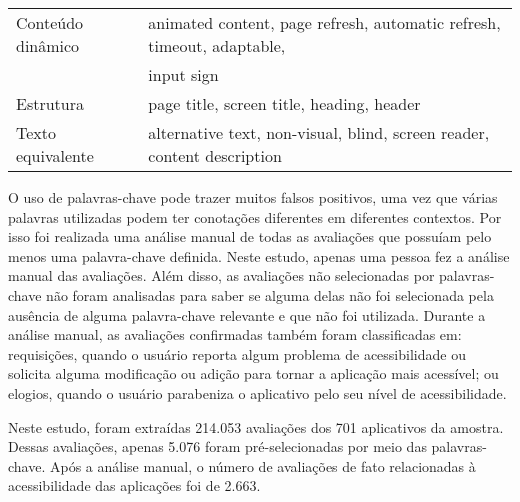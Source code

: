 \begin{table}[!htb]
\begin{tabular}{|l|l|}
\hline
Conteúdo dinâmico & animated content, page refresh, automatic  
refresh, timeout,  adaptable, \\&input sign                                                               \\

\hline
Estrutura                   & page title, screen title, heading, header                                                                                                         \\
\hline
Texto equivalente             & alternative text, non-visual, blind, screen reader, content description  \\
\hline
\end{tabular}
\end{table}

O uso de palavras-chave pode trazer muitos falsos positivos, uma vez que várias palavras utilizadas podem ter conotações diferentes em diferentes contextos. Por isso foi realizada uma análise manual de todas as avaliações que possuíam pelo menos uma palavra-chave definida. Neste estudo, apenas uma pessoa fez a análise manual das avaliações. Além disso, as avaliações não selecionadas por palavras-chave não foram analisadas para saber se alguma delas não foi selecionada pela ausência de alguma palavra-chave relevante e que não foi utilizada. Durante a análise manual, as avaliações confirmadas também foram classificadas em: 
requisições, quando o usuário reporta algum problema de acessibilidade ou solicita alguma modificação ou adição para tornar a aplicação mais acessível;
ou elogios, quando o usuário parabeniza o aplicativo pelo seu nível de acessibilidade.

Neste estudo, foram extraídas 214.053 avaliações dos 701 aplicativos da amostra. 
Dessas avaliações, apenas 5.076 foram pré-selecionadas por meio das palavras-chave. 
Após a análise manual, o número de avaliações de fato relacionadas à acessibilidade das aplicações foi de 2.663. 

